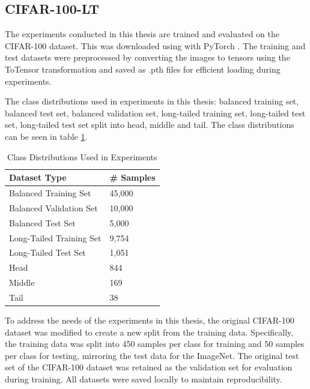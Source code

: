 \subsection{CIFAR-100-LT}
The experiments conducted in this thesis are trained and evaluated on the CIFAR-100 dataset. This was downloaded using with PyTorch \cite{pytorch_cifar100}. The training and test datasets were preprocessed by converting the images to tensors using the ToTensor transformation and saved as .pth files for efficient loading during experiments. 

The class distributions used in experiments in this thesis: balanced training set, balanced test set, balanced validation set, long-tailed training set, long-tailed test set, long-tailed test set split into head, middle and tail. The class distributions can be seen in table \ref{tab:class_distributions}.

\begin{table}[h!]
    \centering
    \caption{Class Distributions Used in Experiments}
    \label{tab:class_distributions}
    \small
    \begin{tabular}{ll}
    \toprule
    \textbf{Dataset Type}                       & \textbf{\# Samples}                                                                 \\ \midrule
    Balanced Training Set                       & 45,000        \\ 
    Balanced Validation Set                     & 10,000    \\ 
    Balanced Test Set                           & 5,000    \\ \hline
    Long-Tailed Training Set                    & 9,754      \\ 
    Long-Tailed Test Set                        & 1,051 \\ \hline
    Head  & 844 \\ 
    Middle   & 169 \\ 
    Tail  & 38 \\
    \bottomrule
    \end{tabular}
    \end{table}
    

\noindent To address the needs of the experiments in this thesis, the original CIFAR-100 dataset was modified to create a new split from the training data. Specifically, the training data was split into 450 samples per class for training and 50 samples per class for testing, mirroring the test data for the ImageNet. The original test set of the CIFAR-100 dataset was retained as the validation set for evaluation during training. All datasets were saved locally to maintain reproducibility.


